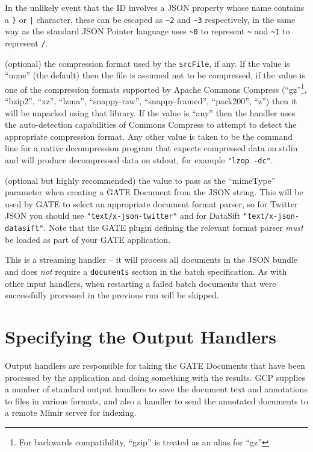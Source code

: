   In the unlikely event that the ID involves a JSON property whose name
  contains a \verb!}! or \verb!|! character, these can be escaped as \verb!~2!
  and \verb!~3! respectively, in the same way as the standard JSON Pointer
  language uses \verb!~0! to represent \verb!~! and \verb!~1! to represent
  \verb!/!.
\item[compression] (optional) the compression format used by the
  \verb!srcFile!, if any.  If the value is ``none'' (the default) then the file
  is assumed not to be compressed, if the value is one of the compression formats
  supported by Apache Commons Compress (``gz''\footnote{For backwards
  compatibility, ``gzip'' is treated as an alias for ``gz''}, ``bzip2'',
  ``xz'', ``lzma'', ``snappy-raw'', ``snappy-framed'', ``pack200'', ``z'') then 
  it will be unpacked using that library.  If the value is ``any'' then the
  handler uses the auto-detection capabilities of Commons Compress to attempt
  to detect the appropriate compression format.  Any other value is taken to be
  the command line for a native decompression program that expects compressed
  data on stdin and will produce decompressed data on stdout, for example
  \verb!"lzop -dc"!.
\item[mimeType] (optional but highly recommended) the value to pass as the
  ``mimeType'' parameter when creating a GATE Document from the JSON string.
  This will be used by GATE to select an appropriate document format parser, so
  for Twitter JSON you should use \verb!"text/x-json-twitter"! and for DataSift
  \verb!"text/x-json-datasift"!.  Note that the GATE plugin defining the
  relevant format parser \emph{must} be loaded as part of your GATE
  application.
\ede

This is a streaming handler -- it will process all documents in the JSON bundle
and does \emph{not} require a \verb!documents! section in the batch
specification.  As with other input handlers, when restarting a failed batch
documents that were successfully processed in the previous run will be skipped.

\section{Specifying the Output Handlers}

Output handlers are responsible for taking the GATE Documents that have been
processed by the application and doing something with the results.  GCP
supplies a number of standard output handlers to save the document text and
annotations to files in various formats, and also a handler to send the
annotated documents to a remote M\'{i}mir server for indexing.

